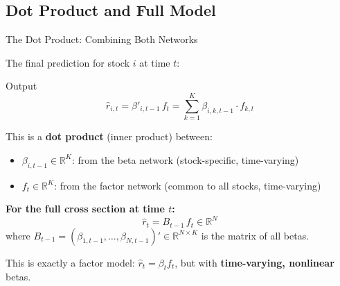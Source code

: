 \documentclass[aspectratio=169]{beamer}
\newcommand{\R}{\mathbb{R}}
\begin{document}
\subsection{Dot Product and Full Model}
%
\begin{frame}{The Dot Product: Combining Both Networks}

The final prediction for stock $i$ at time $t$:

\begin{block}{Output}
\vspace{-0.5em}
\[
\boxed{\hat{r}_{i,t} = \beta'_{i,t-1}\, f_t = \sum_{k=1}^{K} \beta_{i,k,t-1} \cdot f_{k,t}}
\]
\end{block}

\vspace{0.3em}
This is a \textbf{dot product} (inner product) between:
\begin{itemize}
    \item $\beta_{i,t-1} \in \R^K$: from the beta network (stock-specific, time-varying)
    \item $f_t \in \R^K$: from the factor network (common to all stocks, time-varying)
\end{itemize}

\vspace{0.5em}
\textbf{For the full cross section at time $t$:}
\[
\hat{r}_t = B_{t-1}\, f_t \in \R^N
\]
where $B_{t-1} = (\beta_{1,t-1}, \ldots, \beta_{N,t-1})' \in \R^{N \times K}$ is the matrix of all betas.

\vspace{0.3em}
This is exactly a factor model: $\hat{r}_t = \beta_t f_t$, but with \textbf{time-varying, nonlinear} betas.
\end{frame}
%
%
\end{document}
